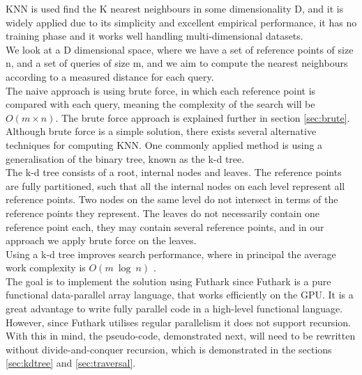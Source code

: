 KNN is used find the K nearest neighbours in some dimensionality D, and it is widely applied due to its simplicity and excellent empirical performance, it has no training phase and it works well handling multi-dimensional datasets. 
\\[2mm]
We look at a D dimensional space, where we have a set of reference points of size n, and a set of queries of size m, and we aim to compute the nearest neighbours according to a measured distance for each query. 
\\[2mm]
The naive approach is using brute force, in which each reference point is compared with each query, meaning the complexity of the search will be $O(m\times n)$. The brute force approach is explained further in section \ref{sec:brute}. Although brute force is a simple solution, there exists several alternative techniques for computing KNN. One commonly applied method is using a generalisation of the binary tree, known as the k-d tree. 
\\[2mm]
The k-d tree consists of a root, internal nodes and leaves. 
The reference points are fully partitioned, such that all the internal nodes on each level represent all reference points. Two nodes on the same level do not intersect in terms of the reference points they represent.
The leaves do not necessarily contain one reference point each, they may contain several reference points, and in our approach we apply brute force on the leaves.  
\\[2mm]
Using a k-d tree improves search performance, where in principal the average work complexity is $O(m\ \log\ n)$ \cite{logmatches}. %
\\[2mm]
The goal is to implement the solution using Futhark since Futhark is a pure functional data-parallel array language, that works efficiently on the GPU. 
It is a great advantage to write fully parallel code in a high-level functional language. However, since Futhark utilises regular parallelism it does not support recursion. With this in mind, the pseudo-code, demonstrated next, will need to be rewritten without divide-and-conquer recursion, which is demonstrated in the sections \ref{sec:kdtree} and \ref{sec:traversal}.

